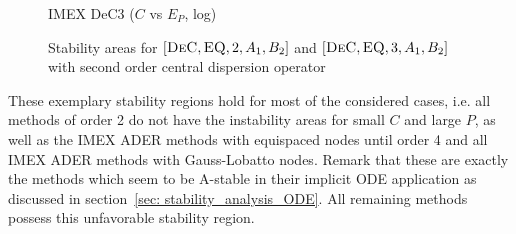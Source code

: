 \begin{example}
\begin{figure}
\begin{minipage}[t]{0.32\textwidth}
			IMEX DeC3 ($C$ vs $E_P$, log)
		\end{minipage}
		\caption{Stability areas for $[\textsc{DeC}, \textsc{EQ},2,A_1, B_2]$ and $[\textsc{DeC}, \textsc{EQ},3,A_1, B_2]$ with second order central dispersion operator}
		\label{fig: disp_IIMEXDeC2/3}
	\end{figure}
\end{example}
These exemplary stability regions hold for most of the considered cases, i.e. all methods of order 2 do not have the instability areas for small $C$ and large $P$, as well as the IMEX ADER methods with equispaced nodes until order 4 and all IMEX ADER methods with Gauss-Lobatto nodes. 
Remark that these are exactly the methods which seem to be A-stable in their implicit ODE application as discussed in section~\ref{sec: stability_analysis_ODE}. 
All remaining methods possess this unfavorable stability region. 








